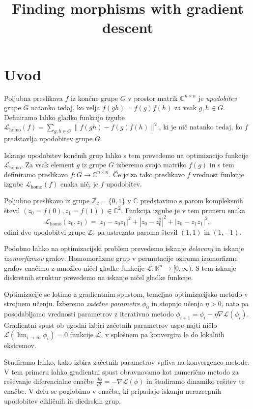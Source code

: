 \documentclass[mat2, tisk]{fmfdelo}
\title{Finding morphisms with gradient
descent}
\newcommand{\R}{\mathbb R}
\newcommand{\Z}{\mathbb Z}
\newcommand{\loss}{\mathcal L}
\newcommand{\Loss}[1]{\mathcal L _\text{#1}}
\newcommand{\C}{\mathbb C}
\begin{document}
\section{Uvod}
Poljubna preslikava $f$ iz končne grupe $G$ v prostor
matrik $\C^{n\times n}$ je \emph{upodobitev} grupe $G$ natanko tedaj,
ko velja $f(g h) = f(g) f(h)$ za vsak $g, h \in G$.
Definiramo lahko gladko funkcijo izgube
$\Loss{homo} (f) = \sum\limits_{g, h \in G} \|f(g h) - f(g)
f(h)\|^2$, ki je nič
natanko tedaj, ko $f$ predstavlja upodobitev grupe $G$.

Iskanje upodobitev končnih grup lahko s tem prevedemo na optimizacijo
funkcije $\Loss{homo}$. Za vsak element $g$ iz grupe $G$ izberemo svojo
matriko $f(g)$ in s tem definiramo preslikavo
$f \colon G \to \C^{n \times n}$. Če je za tako preslikavo $f$
vrednost funkcije
izgube $\Loss{homo}(f)$ enaka nič, je $f$ upodobitev.
\begin{primer}
  {
    Poljubno preslikavo iz grupe $\Z_2 = \{0, 1\}$ v $\C$
    predstavimo s parom kompleksnih
    števil $(z_0= f(0),z_1=f(1)) \in \C^2$. Funkcija izgube je v tem
    primeru enaka
    $$
    \Loss{homo} (z_0, z_1) = |z_1 - z_0 z_1|^2 +
    |z_0 - z_0^2|^2 + |z_0 - z_1 z_1|^2,
    $$
    edini dve upodobitvi grupe $\Z_2$ pa ustrezata paroma števil
    $(1,1)$ in $(1,-1)$.
  }
\end{primer}
Podobno lahko na optimizacijski problem prevedemo iskanje
\emph{delovanj} in iskanje
\emph{izomorfizmov}
grafov. Homomorfizme grup v permutacije oziroma izomorfizme grafov
enačimo
z množico ničel gladke funkcije
$\loss \colon \R^n \to [0, \infty)$. S tem iskanje diskretnih struktur
prevedemo na iskanje ničel gladke funkcije.

Optimizacije se lotimo z gradientnim spustom, temeljno
optimizacijsko metodo v strojnem učenju. Izberemo
\emph{začetne parametre} $\phi_0$ in stopnjo učenja
$\eta > 0$, nato pa posodabljamo vrednosti parametrov z iterativno metodo
$\phi_{i+1} = \phi_i - \eta \nabla \mathcal{L}(\phi_i)$. Gradientni
spust ob ugodni izbiri
začetnih parametrov uspe najti ničlo $\loss(\lim_{i \to \infty} \phi_i) =0$
funkcije $\loss$, v splošnem pa konvergira le do lokalnih ekstremov.

Študiramo lahko, kako izbira začetnih parametrov vpliva na konvergenco metode.
V tem primeru lahko gradientni spust obravnavamo kot numerično metodo
za reševanje
diferencialne enačbe
$\frac{d\phi}{dt} = - \nabla \loss(\phi)$ in študiramo dinamiko
rešitev te enačbe.
V delu se poglobimo v enačbe, ki pripadajo iskanju nerazcepnih
upodobitev cikličnih in diedrskih grup.
\end{document}
